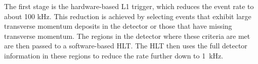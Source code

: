 The first stage is the hardware-based \ac{L1} trigger, which reduces the event rate to about 100 kHz. This reduction is achieved by selecting events that exhibit large transverse momentum deposits in the detector or those that have missing transverse momentum. The regions in the detector where these criteria are met are then passed to a software-based \ac{HLT}. The \ac{HLT} then uses the full detector information in these regions to reduce the rate further down to \qty[]{1}{kHz}.
